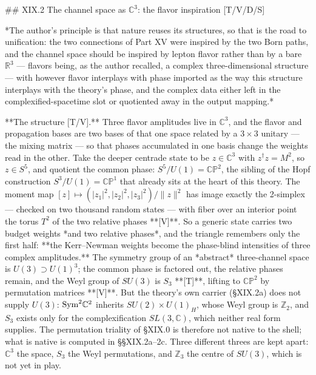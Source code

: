 ## XIX.2 The channel space as $\mathbb C^3$: the flavor inspiration [T/V/D/S]

*The author's principle is that nature reuses its structures, so that is the road to unification: the two connections of Part XV were inspired by the two Born paths, and the channel space should be inspired by lepton flavor rather than by a bare $\mathbb R^3$ — flavors being, as the author recalled, a complex three-dimensional structure — with however flavor interplays with phase imported as the way this structure interplays with the theory's phase, and the complex data either left in the complexified-spacetime slot or quotiented away in the output mapping.*

**The structure [T/V].** Three flavor amplitudes live in $\mathbb C^3$, and the flavor and propagation bases are two bases of that one space related by a $3\times3$ unitary — the mixing matrix — so that phases accumulated in one basis change the weights read in the other. Take the deeper centrade state to be $z\in\mathbb C^3$ with $z^\dagger z = M^2$, so $z\in S^5$, and quotient the common phase: $S^5/U(1) = \mathbb{CP}^2$, the sibling of the Hopf construction $S^3/U(1) = \mathbb{CP}^1$ that already sits at the heart of this theory. The moment map $[z]\mapsto(|z_1|^2,|z_2|^2,|z_3|^2)/\|z\|^2$ has image exactly the 2-simplex — checked on two thousand random states — with fiber over an interior point the torus $T^2$ of the two relative phases **[V]**. So a generic state carries two budget weights *and two relative phases*, and the triangle remembers only the first half: **the Kerr–Newman weights become the phase-blind intensities of three complex amplitudes.** The symmetry group of an *abstract* three-channel space is $U(3)\supset U(1)^3$; the common phase is factored out, the relative phases remain, and the Weyl group of $SU(3)$ is $S_3$ **[T]**, lifting to $\mathbb{CP}^2$ by permutation matrices **[V]**. But the theory's own carrier (§XIX.2a) does not supply $U(3)$: ${\rm Sym}^2\mathbb C^2$ inherits $SU(2)\times U(1)_H$, whose Weyl group is $\mathbb Z_2$, and $S_3$ exists only for the complexification $SL(3,\mathbb C)$, which neither real form supplies. The permutation triality of §XIX.0 is therefore not native to the shell; what is native is computed in §§XIX.2a–2c. Three different threes are kept apart: $\mathbb C^3$ the space, $S_3$ the Weyl permutations, and $\mathbb Z_3$ the centre of $SU(3)$, which is not yet in play.

